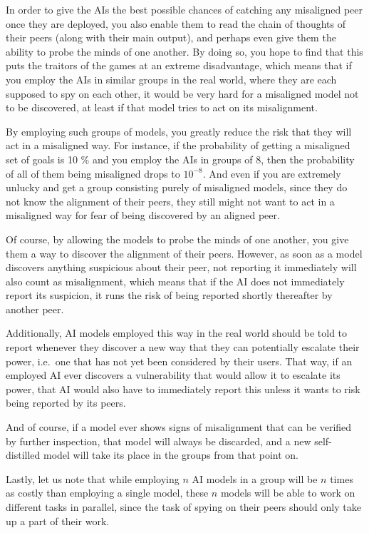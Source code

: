 \documentclass{article}
\begin{document}
In order to give the AIs the best possible chances of catching any misaligned peer once they are deployed, you also enable them to read the chain of thoughts of their peers (along with their main output), and perhaps even give them the ability to probe the minds of one another. By doing so, you hope to find that this puts the traitors of the games at an extreme disadvantage, which means that if you employ the AIs in similar groups in the real world, where they are each supposed to spy on each other, it would be very hard for a misaligned model not to be discovered, at least if that model tries to act on its misalignment.

By employing such groups of models, you greatly reduce the risk that they will act in a misaligned way. For instance, if the probability of getting a misaligned set of goals is 10 \% and you employ the AIs in groups of 8, then the probability of all of them being misaligned drops to $10^{-8}$. And even if you are extremely unlucky and get a group consisting purely of misaligned models, since they do not know the alignment of their peers, they still might not want to act in a misaligned way for fear of being discovered by an aligned peer.

Of course, by allowing the models to probe the minds of one another, you give them a way to discover the alignment of their peers. However, as soon as a model discovers anything suspicious about their peer, not reporting it immediately will also count as misalignment, which means that if the AI does not immediately report its suspicion, it runs the risk of being reported shortly thereafter by another peer.

Additionally, AI models employed this way in the real world should be told to report whenever they discover a new way that they can potentially escalate their power, i.e.\ one that has not yet been considered by their users. That way, if an employed AI ever discovers a vulnerability that would allow it to escalate its power, that AI would also have to immediately report this unless it wants to risk being reported by its peers.

And of course, if a model ever shows signs of misalignment that can be verified by further inspection, that model will always be discarded, and a new self-distilled model will take its place in the groups from that point on.

Lastly, let us note that while employing $n$ AI models in a group will be $n$ times as costly than employing a single model, these $n$ models will be able to work on different tasks in parallel, since the task of spying on their peers should only take up a part of their work.
\end{document}

